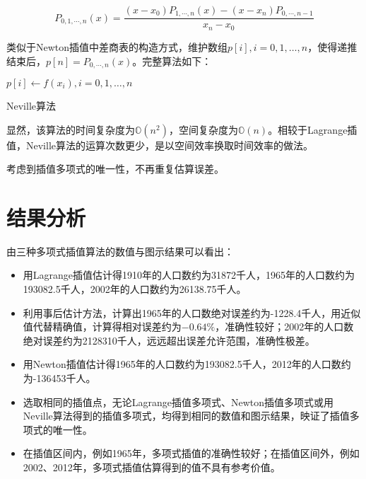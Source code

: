 \documentclass[degree=report, output=electronic]{ustcthesis}
\begin{document}
\begin{equation}
  P_{0,1,\cdots,n}(x)=\frac{(x-x_0)P_{1,\cdots,n}(x)-(x-x_n)P_{0,\cdots,n-1}}{x_n-x_0}
\end{equation}

类似于Newton插值中差商表的构造方式，维护数组$p[i],i=0,1,\dots,n$，使得递推结束后，$p[n]=P_{0,\cdots,n}(x)$。完整算法如下：

\begin{algorithm}[h]
  \SetAlgoLined
  
  $p[i]\leftarrow f(x_i), i=0,1,\dots,n$\;
  \caption{Neville算法}
  \label{algo:neville}
\end{algorithm}

显然，该算法的时间复杂度为$\mathbb{O}(n^2)$，空间复杂度为$\mathbb{O}(n)$。相较于Lagrange插值，Neville算法的运算次数更少，是以空间效率换取时间效率的做法。

考虑到插值多项式的唯一性，不再重复估算误差。

\section{结果分析}

由三种多项式插值算法的数值与图示结果可以看出：

\begin{itemize}
  \item 用Lagrange插值估计得1910年的人口数约为31872千人，1965年的人口数约为193082.5千人，2002年的人口数约为26138.75千人。
  \item 利用事后估计方法，计算出1965年的人口数绝对误差约为-1228.4千人，用近似值代替精确值，计算得相对误差约为$-0.64\%$，准确性较好；2002年的人口数绝对误差约为2128310千人，远远超出误差允许范围，准确性极差。
  \item 用Newton插值估计得1965年的人口数约为193082.5千人，2012年的人口数约为-136453千人。
  \item 选取相同的插值点，无论Lagrange插值多项式、Newton插值多项式或用Neville算法得到的插值多项式，均得到相同的数值和图示结果，映证了插值多项式的唯一性。
  \item 在插值区间内，例如1965年，多项式插值的准确性较好；在插值区间外，例如2002、2012年，多项式插值估算得到的值不具有参考价值。
\end{itemize}
\end{document}
